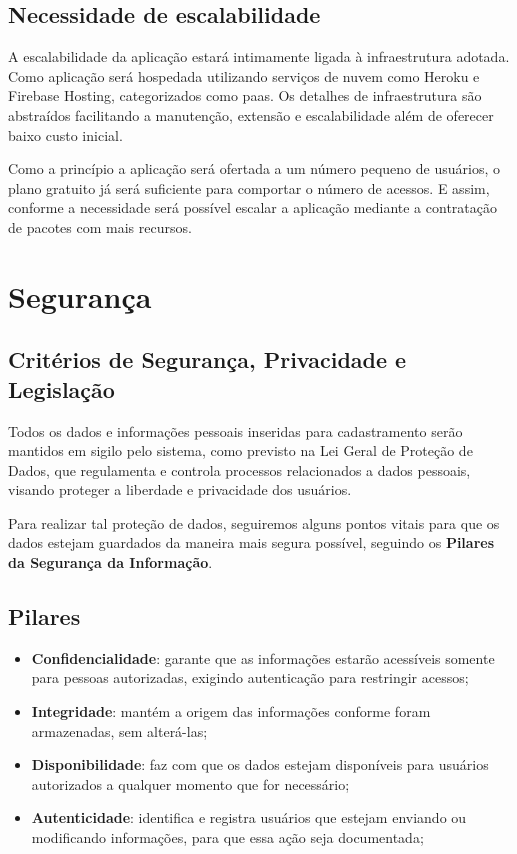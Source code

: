 \documentclass[
    12pt,               %
    openright,          %
    oneside,
    a4paper,            %
    paginasA3,  %
    english,            %
    brazil              %
    ]{ifsp-spo-inf-ctds} %
\begin{document}
\section{Necessidade de escalabilidade}
A escalabilidade da aplicação estará intimamente ligada à infraestrutura adotada. Como aplicação será hospedada utilizando serviços de nuvem como Heroku e Firebase Hosting, categorizados como \ac{paas}. Os detalhes de infraestrutura são abstraídos facilitando a manutenção, extensão e escalabilidade além de oferecer baixo custo inicial. 

Como a princípio a aplicação será ofertada a um número pequeno de usuários, o plano  gratuito já será suficiente para comportar o número de acessos. E assim, conforme a necessidade será possível escalar a aplicação mediante a contratação de pacotes com mais recursos.


\chapter {Segurança}
\section {Critérios de Segurança, Privacidade e Legislação}
Todos os dados e informações pessoais inseridas para cadastramento serão mantidos em sigilo pelo sistema, como previsto na Lei Geral de Proteção de Dados, que regulamenta e controla processos relacionados a dados pessoais, visando proteger a liberdade e privacidade dos usuários.


Para realizar tal proteção de dados, seguiremos alguns pontos vitais para que os dados estejam guardados da maneira mais segura possível, seguindo os \textbf{Pilares da Segurança da Informação}.
\section {Pilares}
\begin{itemize}
\item \textbf{Confidencialidade}: garante que as informações estarão acessíveis somente para pessoas autorizadas, exigindo autenticação para restringir acessos;
\item \textbf{Integridade}: mantém a origem das informações conforme foram armazenadas, sem alterá-las;
\item \textbf{Disponibilidade}: faz com que os dados estejam disponíveis para usuários autorizados a qualquer momento que for necessário;
\item \textbf{Autenticidade}: identifica e registra usuários que estejam enviando ou modificando informações, para que essa ação seja documentada;
\end{itemize}
\end{document}
